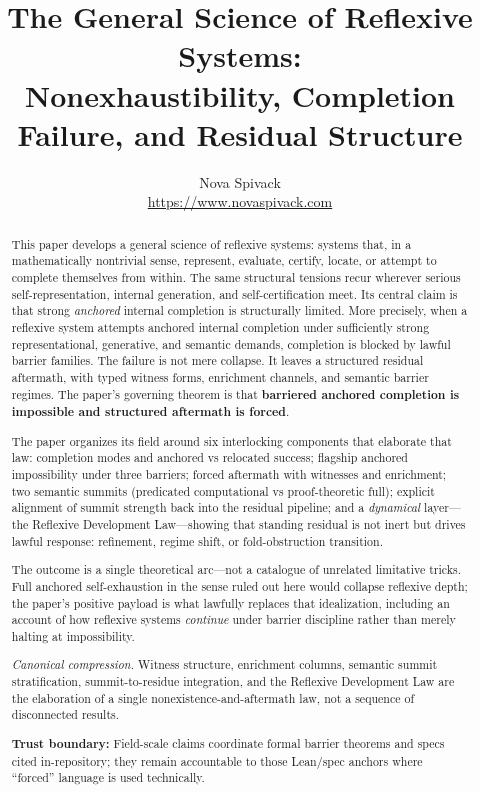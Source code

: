 \documentclass[11pt]{article}
\title{The General Science of Reflexive Systems:\\
Nonexhaustibility, Completion Failure, and Residual Structure}
\author{Nova Spivack\\\url{https://www.novaspivack.com}}
\date{}
\theoremstyle{plain}
\theoremstyle{definition}
\theoremstyle{remark}
\begin{document}
\maketitle
\NovaZenodoAfterTitle


\begin{abstract}
\raggedright
This paper develops a general science of reflexive systems: systems that, in a mathematically nontrivial sense, represent, evaluate, certify, locate, or attempt to complete themselves from within. The same structural tensions recur wherever serious self-representation, internal generation, and self-certification meet. Its central claim is that strong \emph{anchored} internal completion is structurally limited. More precisely, when a reflexive system attempts anchored internal completion under sufficiently strong representational, generative, and semantic demands, completion is blocked by lawful barrier families. The failure is not mere collapse. It leaves a structured residual aftermath, with typed witness forms, enrichment channels, and semantic barrier regimes.
The paper's governing theorem is that \textbf{barriered anchored completion is impossible and structured aftermath is forced}.

The paper organizes its field around six interlocking components that elaborate that law: completion modes and anchored vs relocated success; flagship anchored impossibility under three barriers; forced aftermath with witnesses and enrichment; two semantic summits (predicated computational vs proof-theoretic full); explicit alignment of summit strength back into the residual pipeline; and a \emph{dynamical} layer---the Reflexive Development Law---showing that standing residual is not inert but drives lawful response: refinement, regime shift, or fold-obstruction transition.

The outcome is a single theoretical arc---not a catalogue of unrelated limitative tricks. Full anchored self-exhaustion in the sense ruled out here would collapse reflexive depth; the paper's positive payload is what lawfully replaces that idealization, including an account of how reflexive systems \emph{continue} under barrier discipline rather than merely halting at impossibility.

\medskip
\noindent\textit{Canonical compression.} Witness structure, enrichment columns, semantic summit stratification, summit-to-residue integration, and the Reflexive Development Law are the elaboration of a single nonexistence-and-aftermath law, not a sequence of disconnected results.

\medskip
\noindent\textbf{Trust boundary:} Field-scale claims coordinate formal barrier theorems and specs cited in-repository; they remain accountable to those Lean/spec anchors where ``forced'' language is used technically.


\NovaZenodoInAbstract
\end{abstract}
\end{document}
